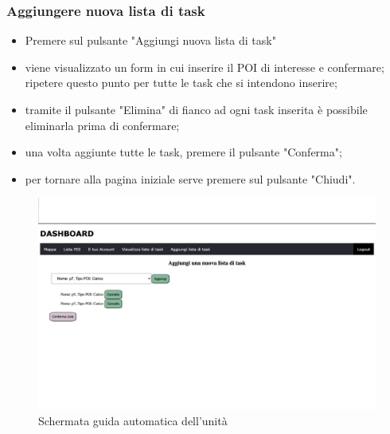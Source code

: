 \subsubsection{Aggiungere nuova lista di task}
\begin{itemize}
    \item Premere sul pulsante "Aggiungi nuova lista di task"
    \item viene visualizzato un form in cui inserire il POI di interesse e confermare; \\ripetere questo punto per tutte le task che si intendono inserire;
    \item tramite il pulsante "Elimina" di fianco ad ogni task inserita è possibile eliminarla prima di confermare;
    \item una volta aggiunte tutte le task, premere il pulsante "Conferma";
    \item per tornare alla pagina iniziale serve premere sul pulsante "Chiudi".
\end{itemize}

\begin{figure}[H]
    \centering
    \includegraphics[scale=0.12]{res/images/newtask_manager.png}
    \caption{Schermata guida automatica dell'unità}
\end{figure}

